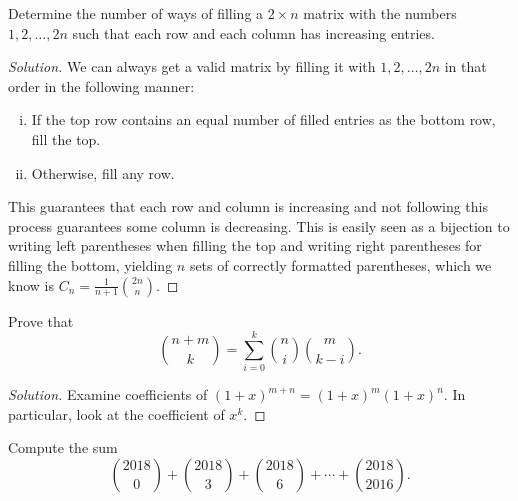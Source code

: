 \begin{prb}
Determine the number of ways of filling a $2 \times n$ matrix with the numbers
$1, 2, \dots, 2n$ such that each row and each column has increasing entries.
\end{prb}

\ifsolutions
\begin{proof}[Solution]
We can always get a valid matrix by filling it with $1, 2, \dots, 2n$ in that
order in the following manner:

\begin{enumerate}[(i)]
\item
If the top row contains an equal number of filled entries as the bottom row,
fill the top.
\item
Otherwise, fill any row.
\end{enumerate}
This guarantees that each row and column is increasing and not following this
process guarantees some column is decreasing. This is easily seen as a bijection
to writing left parentheses when filling the top and writing right parentheses
for filling the bottom, yielding $n$ sets of correctly formatted parentheses,
which we know is $C_n = \frac{1}{n + 1} \binom{2n}{n}$.
\end{proof}
\fi

\begin{prb}[Vandermonde]
Prove that
\[ \binom{n + m}{k} = \sum_{i = 0}^k \binom{n}{i} \binom{m}{k - i}. \]
\end{prb}

\ifsolutions
\begin{proof}[Solution]
Examine coefficients of $(1 + x)^{m + n} = (1 + x)^m (1 + x)^n$. In particular,
look at the coefficient of $x^k$.
\end{proof}
\fi

\begin{prb}
Compute the sum
\[ \binom{2018}{0} + \binom{2018}{3} + \binom{2018}{6} + \cdots +
\binom{2018}{2016}. \]
\end{prb}

